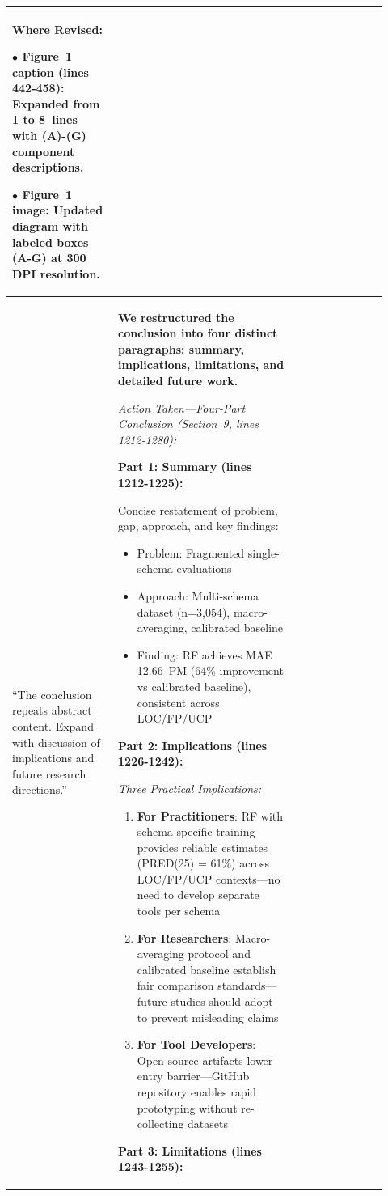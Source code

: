 \documentclass[11pt,a4paper]{article}
\begin{document}
\begin{longtable}{>{\raggedright\arraybackslash}p{0.26\linewidth}|>{\raggedright\arraybackslash}p{0.44\linewidth}|>{\raggedright\arraybackslash}p{0.22\linewidth}}
\textbf{Where Revised:}

$\bullet$ \textbf{Figure~1 caption} (lines 442-458): Expanded from 1 to 8~lines with (A)-(G) component descriptions.

$\bullet$ \textbf{Figure~1 image}: Updated diagram with labeled boxes (A-G) at 300 DPI resolution. \\

\midrule

``The conclusion repeats abstract content. Expand with discussion of implications and future research directions.'' &

\textbf{We restructured the conclusion into four distinct paragraphs: summary, implications, limitations, and detailed future work.}

\textit{Action Taken---Four-Part Conclusion (Section~9, lines 1212-1280):}

\textbf{Part 1: Summary (lines 1212-1225):}

Concise restatement of problem, gap, approach, and key findings:
\begin{itemize}
    \item Problem: Fragmented single-schema evaluations
    \item Approach: Multi-schema dataset (n=3,054), macro-averaging, calibrated baseline
    \item Finding: RF achieves MAE 12.66~PM (64\% improvement vs calibrated baseline), consistent across LOC/FP/UCP
\end{itemize}

\textbf{Part 2: Implications (lines 1226-1242):}

\textit{Three Practical Implications:}
\begin{enumerate}
    \item \textbf{For Practitioners}: RF with schema-specific training provides reliable estimates (PRED(25) = 61\%) across LOC/FP/UCP contexts---no need to develop separate tools per schema
    \item \textbf{For Researchers}: Macro-averaging protocol and calibrated baseline establish fair comparison standards---future studies should adopt to prevent misleading claims
    \item \textbf{For Tool Developers}: Open-source artifacts lower entry barrier---GitHub repository enables rapid prototyping without re-collecting datasets
\end{enumerate}

\textbf{Part 3: Limitations (lines 1243-1255):}


\end{longtable}
\end{document}
